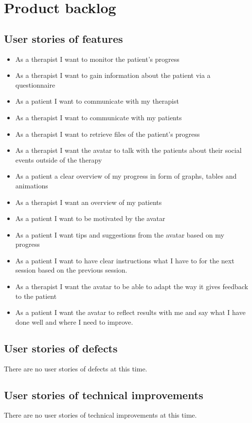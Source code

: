 \chapter{Product backlog}

\section{User stories of features}
\begin{itemize}
\item As a therapist I want to monitor the patient’s progress
\item As a therapist I want to gain information about the patient via a questionnaire
\item As a patient I want to communicate with my therapist
\item As a therapist I want to communicate with my patients
\item As a therapist I want to retrieve files of the patient’s progress
\item As a therapist I want the avatar to talk with the patients about their social events outside of the therapy
\item As a patient a clear overview of my progress in form of graphs, tables and animations
\item As a therapist I want an overview of my patients 
\item As a patient I want to be motivated by the avatar
\item As a patient I want tips and suggestions from the avatar based on my progress
\item As a patient I want to have clear instructions what I have to for the next session based on the previous session.
\item As a therapist I want the avatar to be able to adapt the way it gives feedback to the patient
\item As a patient I want the avatar to reflect results with me and say what I have done well and where I need to improve.
\end{itemize}
 
\section{User stories of defects}
There are no user stories of defects at this time.

\section{User stories of technical improvements}
There are no user stories of technical improvements at this time.

